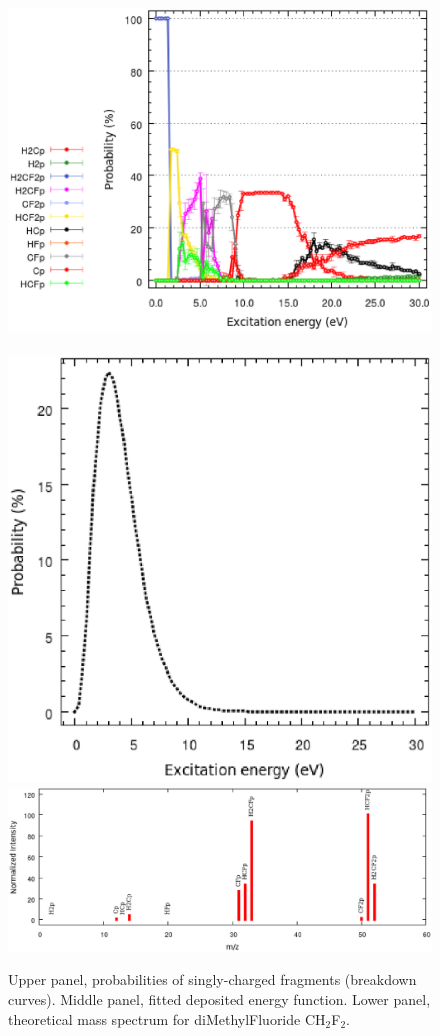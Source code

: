 \documentclass[a4paper,12pt]{article}
\begin{document}
\clearpage
\begin{figure}[h!]
\centering
\includegraphics[scale=0.45]{images/CH2F2+-S.vs.E.eps}\\
\qquad\qquad\,\,
\includegraphics[scale=0.45]{images/CH2F2+-sfE.eps}\\
\includegraphics[scale=0.45]{images/CH2F2-theoSpectrum.eps}
\caption{\footnotesize{
Upper panel, probabilities of singly-charged fragments (breakdown curves). Middle panel, fitted deposited energy function. Lower panel, theoretical mass 
spectrum for diMethylFluoride CH$_2$F$_2$.
}}
\label{fig: theoretical mass spectrum diMethylFluoride}
\end{figure}
\end{document}
